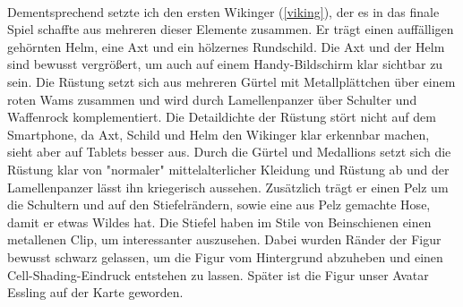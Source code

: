 \documentclass[extern,palatino]{cgBA}
\begin{document}
\\Dementsprechend setzte ich den ersten Wikinger (\ref{viking}), der es in das finale Spiel schaffte aus mehreren dieser Elemente zusammen. Er trägt einen auffälligen gehörnten Helm, eine Axt und ein hölzernes Rundschild. Die Axt und der Helm sind bewusst vergrößert, um auch auf einem Handy-Bildschirm klar sichtbar zu sein. Die Rüstung setzt sich aus mehreren Gürtel mit Metallplättchen über einem roten Wams zusammen und wird durch Lamellenpanzer über Schulter und Waffenrock komplementiert. Die Detaildichte der Rüstung stört nicht auf dem Smartphone, da Axt, Schild und Helm den Wikinger klar erkennbar machen, sieht aber auf Tablets besser aus. Durch die Gürtel und Medallions setzt sich die Rüstung klar von "normaler" mittelalterlicher Kleidung und Rüstung ab und der Lamellenpanzer lässt ihn kriegerisch aussehen. Zusätzlich trägt er einen Pelz um die Schultern und auf den Stiefelrändern, sowie eine aus Pelz gemachte Hose, damit er etwas Wildes hat. Die Stiefel haben im Stile von Beinschienen einen metallenen Clip, um interessanter auszusehen. Dabei wurden Ränder der Figur bewusst schwarz gelassen, um die Figur vom Hintergrund abzuheben und einen Cell-Shading-Eindruck entstehen zu lassen. Später ist die Figur unser Avatar Essling auf der Karte geworden.

\newpage
\end{document}
